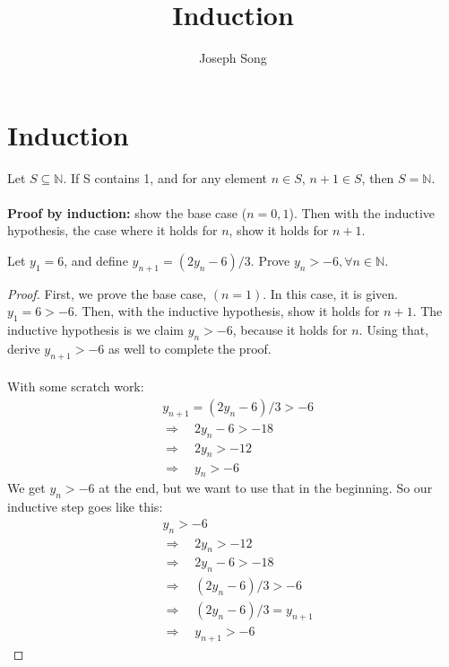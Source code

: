 \documentclass{article}
\title{Induction}
\author{Joseph Song}
\date{}
\begin{document}
\maketitle

\section{Induction}
Let $S \subseteq \mathbb{N}$. If S contains 1, and for any element $n \in S$, $n + 1 \in S$, then $S = \mathbb{N}$.
\\
\\
\textbf{Proof by induction:} show the base case ($n = 0, 1$). Then with the inductive hypothesis, the case where it holds for $n$, show it holds for $n + 1$. 

\begin{example}
Let $y_1 = 6$, and define $y_{n+1} = (2y_n-6)/3$.
Prove $y_n > -6, \forall n \in \mathbb{N}$.
\end{example}
\begin{proof}
    First, we prove the base case, $(n=1)$. In this case, it is given. $y_1=6>-6$.
    Then, with the inductive hypothesis, show it holds for $n+1$.
    The inductive hypothesis is we claim $y_n > -6$, because it holds for $n$. Using that, derive $y_{n+1} > -6$ as well to complete the proof.
    \\
    \\
    With some scratch work: 
    \begin{align*}
         &y_{n+1} = (2y_n-6)/3 > -6 \\
         &\Rightarrow\quad 2y_n-6 > -18 \\
         &\Rightarrow\quad 2y_n > - 12 \\ 
         &\Rightarrow\quad y_n > -6
    \end{align*}
    We get $y_n > -6$ at the end, but we want to use that in the beginning. So our inductive step goes like this:
    \begin{align*}
       &y_n > - 6\\
       &\Rightarrow\quad 2y_n > -12 \\
       &\Rightarrow\quad 2y_n - 6 > -18 \\
       &\Rightarrow\quad (2y_n - 6)/3 > -6 \\
       &\Rightarrow\quad (2y_n - 6)/3 = y_{n+1} \\
       &\Rightarrow\quad y_{n+1} > -6
    \end{align*}
\end{proof}
\end{document}
